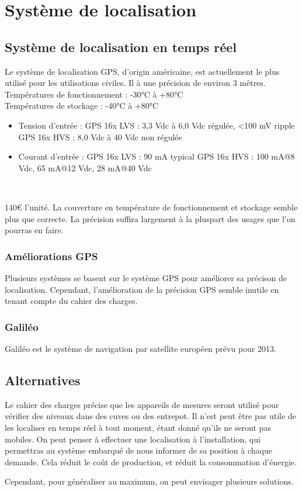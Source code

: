 \section{Système de localisation}

    \subsection{Système de localisation en temps réel}
        { Le système de localisation GPS, d'origin américaine, est actuellement le plus utilisé pour les utilisations civiles.
          Il à une précision de environ 3 mêtres.}
        { Températures de fonctionnement : -30°C à +80°C\\
          Températures de stockage : -40°C à +80°C}
        { \begin{itemize}
                \item Tension d'entrée :
                    \subitem GPS 16x LVS : 3,3 Vdc à 6,0 Vdc régulée, <100 mV ripple
                    \subitem GPS 16x HVS : 8,0 Vdc à 40 Vdc non régulée
                \item Courant d'entrée :
                    \subitem GPS 16x LVS : 90 mA typical
                    \subitem GPS 16x HVS : 100 mA@8 Vdc, 65 mA@12 Vdc, 28 mA@40 Vdc
          \end{itemize}~}
        { 140€ l'unité.}
        {}
        { La couverture en température de fonctionnement et stockage semble plus que correcte.
          La précision suffira largement à la pluspart des usages que l'on pourras en faire.}
	        
	    \subsubsection{Améliorations GPS}
	        Plusieurs systèmes se basent sur le système GPS pour améliorer sa précison de localisation.
	        Cependant, l'amélioration de la précision GPS semble inutile en tenant compte du cahier des charges.

        \subsubsection{Galiléo}
	        Galiléo est le système de navigation par satellite européen prévu pour 2013.
	        
    \subsection{Alternatives}
        Le cahier des charges précise que les appareils de mesures seront utilisé pour vérifier des niveaux dans des cuves ou des entrepot.
        Il n'est peut être pas utile de les localiser en temps réel à tout moment, étant donné qu'ils ne seront pas mobiles.
        On peut penser à effectuer une localisation à l'installation, qui permettras au système embarqué de nous informer de sa position à chaque demande.
        Cela réduit le coût de production, et réduit la consommation d'énergie.
        
        Cependant, pour généraliser au maximum, on peut envisager plusieurs solutions.
